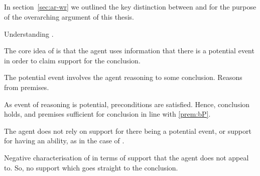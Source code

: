 \subsection{\WR{}}
\label{sec:wr}

\begin{note}[Overview]
  In section~\ref{sec:ar-wr} we outlined the key distinction between \AR{} and \WR{} for the purpose of the overarching argument of this thesis.

  Understanding \WR{}.
\end{note}

\begin{note}
  The core idea of \WR{} is that the agent uses information that there is a potential event in order to claim support for the conclusion.

  The potential event involves the agent reasoning to some conclusion.
  Reasons from premises.

  As event of reasoning is potential, preconditions are satisfied.
  Hence, conclusion holds, and premises sufficient for conclusion in line with \ref{prem:bP}.


  The agent does not rely on support for there being a potential event, or support for having an ability, as in the case of \AR{}.
\end{note}

\begin{note}
  Negative characterisation of \WR{} in terms of support that the agent does not appeal to.
  So, no support which goes straight to the conclusion.
\end{note}



